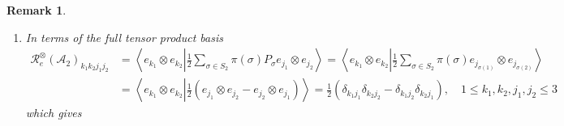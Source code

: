 \documentclass[aps,preprint]{revtex4}%
\newtheorem{remark}[theorem]{Remark}
\begin{document}
\begin{remark}
\begin{enumerate}
\begin{gather}
\begin{array}
\right\vert  & \left\vert
\begin{array}
[c]{cc}%
u_{11} & u_{13}\\
u_{31} & u_{33}%
\end{array}
\right\vert  & \left\vert
\begin{array}
[c]{cc}%
u_{12} & u_{13}\\
u_{32} & u_{33}%
\end{array}
\right\vert \\
\left\vert
\begin{array}
[c]{cc}%
u_{21} & u_{22}\\
u_{31} & u_{32}%
\end{array}
\right\vert  & \left\vert
\begin{array}
[c]{cc}%
u_{21} & u_{23}\\
u_{31} & u_{33}%
\end{array}
\right\vert  & \left\vert
\begin{array}
[c]{cc}%
u_{22} & u_{23}\\
u_{32} & u_{33}%
\end{array}
\right\vert
\end{array}
\right)  \left(
\begin{array}
[c]{c}%
\mathcal{R}_{f}\left(  g\right)  _{12}\\
\mathcal{R}_{f}\left(  g\right)  _{13}\\
\mathcal{R}_{f}\left(  g\right)  _{23}%
\end{array}
\right)  .
\end{gather}


\item In terms of the full tensor product basis
\begin{align}
\mathcal{R}_{e}^{\otimes}\left(  \mathcal{A}_{2}\right)  _{k_{1}k_{2}%
j_{1}j_{2}}  &  =\left\langle e_{k_{1}}\otimes e_{k_{2}}\left\vert \frac{1}%
{2}\sum_{\sigma\in S_{2}}\pi\left(  \sigma\right)  P_{\sigma}\right.
e_{j_{1}}\otimes e_{j_{2}}\right\rangle =\left\langle e_{k_{1}}\otimes
e_{k_{2}}\left\vert \frac{1}{2}\sum_{\sigma\in S_{2}}\pi\left(  \sigma\right)
\right.  e_{j_{\sigma\left(  1\right)  }}\otimes e_{j_{\sigma\left(  2\right)
}}\right\rangle \\
&  =\left\langle e_{k_{1}}\otimes e_{k_{2}}\left\vert \frac{1}{2}\left(
e_{j_{1}}\otimes e_{j_{2}}-e_{j_{2}}\otimes e_{j_{1}}\right)  \right.
\right\rangle =\frac{1}{2}\left(  \delta_{k_{1}j_{1}}\delta_{k_{2}j_{2}%
}-\delta_{k_{1}j_{2}}\delta_{k_{2}j_{1}}\right)  ,\quad1\leq k_{1},k_{2}%
,j_{1},j_{2}\leq3
\end{align}
which gives


\end{enumerate}
\end{remark}
\end{document}
